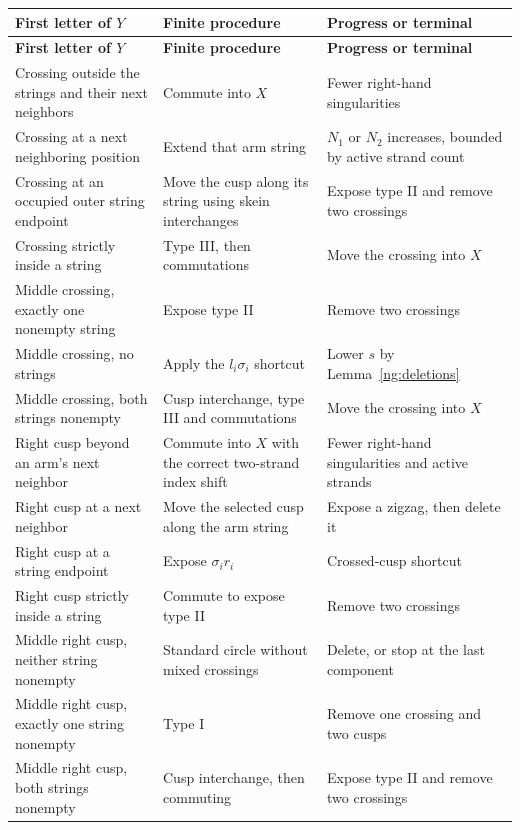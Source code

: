 \begingroup
\small
\setlength{\tabcolsep}{4pt}
\begin{longtable}{@{}>{\raggedright\arraybackslash}p{.30\linewidth}>{\raggedright\arraybackslash}p{.43\linewidth}>{\raggedright\arraybackslash}p{.21\linewidth}@{}}
\textbf{First letter of $Y$} & \textbf{Finite procedure}
 & \textbf{Progress or terminal}\\
\hline
\endfirsthead
\textbf{First letter of $Y$} & \textbf{Finite procedure}
 & \textbf{Progress or terminal}\\
\hline
\endhead
Crossing outside the strings and their next neighbors
 & Commute into $X$
 & Fewer right-hand singularities\\[3pt]
Crossing at a next neighboring position
 & Extend that arm string
 & $N_1$ or $N_2$ increases, bounded by active strand count\\[3pt]
Crossing at an occupied outer string endpoint
 & Move the cusp along its string using skein interchanges
 & Expose type II and remove two crossings\\[3pt]
Crossing strictly inside a string
 & Type III, then commutations
 & Move the crossing into $X$\\[3pt]
Middle crossing, exactly one nonempty string
 & Expose type II
 & Remove two crossings\\[3pt]
Middle crossing, no strings
 & Apply the $l_i\sigma_i$ shortcut
 & Lower $s$ by Lemma~\ref{ng:deletions}\\[3pt]
Middle crossing, both strings nonempty
 & Cusp interchange, type III and commutations
 & Move the crossing into $X$\\[3pt]
Right cusp beyond an arm's next neighbor
 & Commute into $X$ with the correct two-strand index shift
 & Fewer right-hand singularities and active strands\\[3pt]
Right cusp at a next neighbor
 & Move the selected cusp along the arm string
 & Expose a zigzag, then delete it\\[3pt]
Right cusp at a string endpoint
 & Expose $\sigma_i r_i$
 & Crossed-cusp shortcut\\[3pt]
Right cusp strictly inside a string
 & Commute to expose type II
 & Remove two crossings\\[3pt]
Middle right cusp, neither string nonempty
 & Standard circle without mixed crossings
 & Delete, or stop at the last component\\[3pt]
Middle right cusp, exactly one string nonempty
 & Type I
 & Remove one crossing and two cusps\\[3pt]
Middle right cusp, both strings nonempty
 & Cusp interchange, then commuting
 & Expose type II and remove two crossings
\end{longtable}
\endgroup

